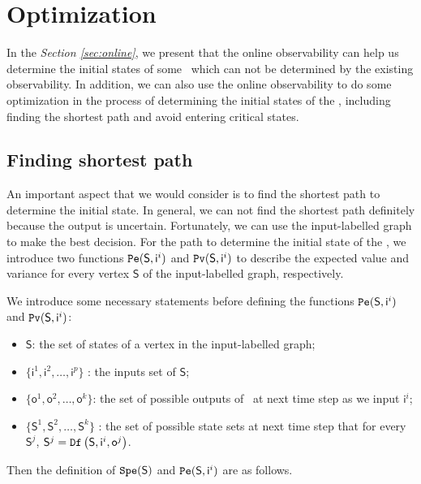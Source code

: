 \section{Optimization}
\label{sec:app}

In the {\em Section \ref{sec:online}}, we present that the online observability can help us determine the initial states of some \BCNs\ which can not be determined by the existing observability. 
In addition, we can also use the online observability to do some optimization in the process of determining the initial states of the \BCNs, including finding the shortest path and avoid entering critical states. 

\subsection{Finding shortest path}
An important aspect that we would consider is to find the shortest path to determine the initial state. In general, we can not find the shortest path definitely because the output is uncertain. Fortunately, we can use the input-labelled graph to make the best decision. For the path to determine the initial state of the \BCNs, we introduce two functions ${\tt Pe}(\mathsf{S},\mathsf{ i}^{i})$ and ${\tt Pv}(\mathsf{S},\mathsf{ i}^{i})$ to describe the expected value and variance for every vertex $\mathsf{S}$ of the input-labelled graph, respectively.%

We introduce some necessary statements before defining the functions ${\tt Pe}(\mathsf{S},\mathsf{ i}^{i})$ and ${\tt Pv}(\mathsf{S},\mathsf{ i}^{i})$:
\begin{itemize}
  \item $\mathsf{S}$: the set of states of a vertex in the input-labelled graph;
  \item $\{\mathsf{ i}^{1},\mathsf{ i}^{2},\ldots, \mathsf{ i}^{p}\}$ : the inputs set of $\mathsf{S}$;
  \item $\{\mathsf{o}^1,\mathsf{o}^2,\ldots,\mathsf{o}^k\}$: the set of possible outputs of \BCN\ at next time step as we input $\mathsf{ i}^{i}$;
 \item $\{\mathsf{S}^{1},\mathsf{S}^{2},\ldots, \mathsf{S}^{k}\}$ : the set of possible state sets at next time step that for every $\mathsf{S}^{j}$, $\mathsf{S}^{j}={\tt Df}\left(\mathsf{S},\mathsf{i}^{i},\mathsf{o}^{j}\right)$.
  
\end{itemize} 

Then the definition of ${\tt Spe}(\mathsf{S})$ and ${\tt Pe}(\mathsf{S},\mathsf{ i}^{i})$ are as follows.

